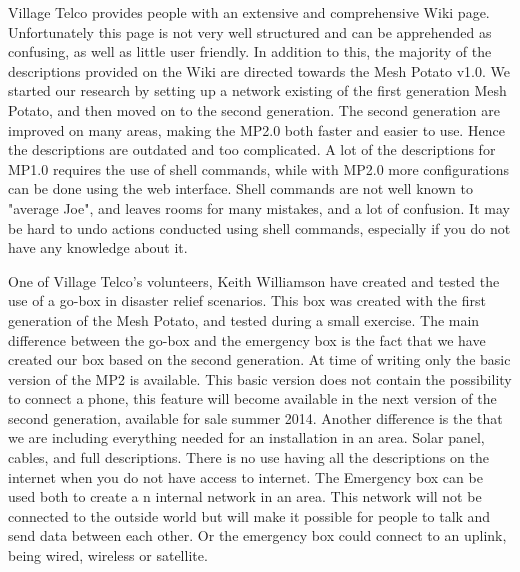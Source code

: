 Village Telco provides people with an extensive and comprehensive Wiki page. Unfortunately this page is not very well structured and can be apprehended as confusing, as well as little user friendly. In addition to this, the majority of the descriptions provided on the Wiki are directed towards the Mesh Potato v1.0. We started our research by setting up a network existing of the first generation Mesh Potato, and then moved on to the second generation. The second generation are improved on many areas, making the MP2.0 both faster and easier to use. Hence the descriptions are outdated and too complicated. A lot of the descriptions for MP1.0 requires the use of shell commands, while with MP2.0 more configurations can be done using the web interface. Shell commands are not well known to "average Joe", and leaves rooms for many mistakes, and a lot of confusion. It may be hard to undo actions conducted using shell commands, especially if you do not have any knowledge about it. 





One of Village Telco's volunteers, Keith Williamson have created and tested the use of a go-box in disaster relief scenarios. This box was created with the first generation of the Mesh Potato, and tested during a small exercise. The main difference between the go-box and the emergency box is the fact that we have created our box based on the second generation. At time of writing only the basic version of the MP2 is available. This basic version does not contain the possibility to connect a phone, this feature will become available in the next version of the second generation, available for sale summer 2014. Another difference is the that we are including everything needed for an installation in an area. Solar panel, cables, and full descriptions. There is no use having all the descriptions on the internet when you do not have access to internet. The Emergency box can be used both to create a n internal network in an area. This network will not be connected to the outside world but will make it possible for people to talk and send data between each other. Or the emergency box could connect to an uplink, being wired, wireless or satellite. 




 




